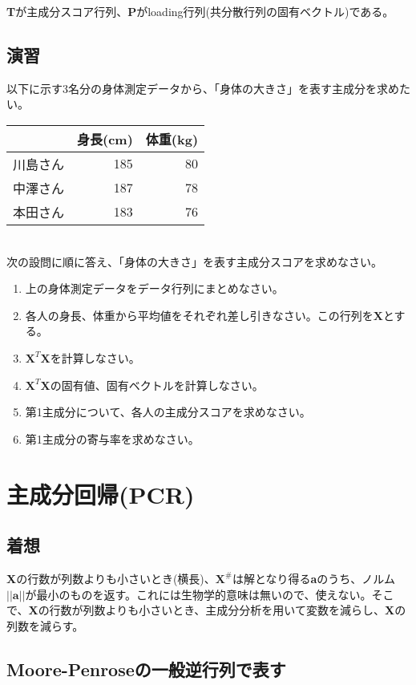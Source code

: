 {\bf T}が主成分スコア行列、{\bf P}がloading行列(共分散行列の固有ベクトル)である。

\subsection{演習}
以下に示す3名分の身体測定データから、「身体の大きさ」を表す主成分を求めたい。\\

\begin{tabular}{l|rr}
\hline
 & 身長(cm) & 体重(kg) \\
\hline
川島さん & 185 & 80 \\
中澤さん & 187 & 78 \\
本田さん & 183 & 76 \\
\hline
\end{tabular}\\

次の設問に順に答え、「身体の大きさ」を表す主成分スコアを求めなさい。
\renewcommand{\labelenumi}{(\arabic{enumi})}

\begin{enumerate}
\item 上の身体測定データをデータ行列にまとめなさい。
\item 各人の身長、体重から平均値をそれぞれ差し引きなさい。この行列を\({\mathbf X}\)とする。
\item \({\mathbf X}^T{\mathbf X}\)を計算しなさい。
\item \({\mathbf X}^T{\mathbf X}\)の固有値、固有ベクトルを計算しなさい。
\item 第1主成分について、各人の主成分スコアを求めなさい。
\item 第1主成分の寄与率を求めなさい。
\end{enumerate}

\section{主成分回帰(PCR)}
\subsection{着想}
{\bf X}の行数が列数よりも小さいとき(横長)、\({\mathbf X^\#}\)は解となり得る{\bf a}のうち、ノルム\(||{\mathbf a}||\)が最小のものを返す。これには生物学的意味は無いので、使えない。そこで、{\bf X}の行数が列数よりも小さいとき、主成分分析を用いて変数を減らし、{\bf X}の列数を減らす。

\subsection{Moore-Penroseの一般逆行列で表す}

